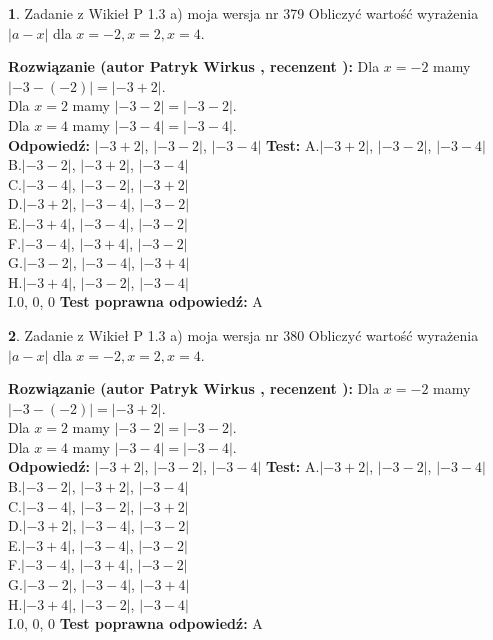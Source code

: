 \documentclass[12pt, a4paper]{article}
\theoremstyle{definition} %
\newtheorem{zad}{}
\newcommand{\zadStart}[1]{\begin{zad}#1\newline}
\newcommand{\zadStop}{\end{zad}}
\newcommand{\rozwStart}[2]{\noindent \textbf{Rozwiązanie (autor #1 , recenzent #2): }\newline}
\newcommand{\rozwStop}{\newline}
\newcommand{\odpStart}{\noindent \textbf{Odpowiedź:}\newline}
\newcommand{\odpStop}{\newline}
\newcommand{\testStart}{\noindent \textbf{Test:}\newline}
\newcommand{\testStop}{\newline}
\newcommand{\kluczStart}{\noindent \textbf{Test poprawna odpowiedź:}\newline}
\newcommand{\kluczStop}{\newline}
\begin{document}
\zadStart{Zadanie z Wikieł P 1.3 a) moja wersja nr 379}
Obliczyć wartość wyrażenia $|a - x|$ dla $x=-2,x=2,x=4$.
\zadStop
\rozwStart{Patryk Wirkus}{}
Dla $x = -2$ mamy $|-3 - (-2)| = |-3 + 2|$.\\
Dla $x = 2$ mamy $|-3 - 2| = |-3 - 2|$.\\
Dla $x = 4$ mamy $|-3 - 4| = |-3 - 4|$.\\
\rozwStop
\odpStart
$|-3 + 2|$, $|-3 - 2|$, $|-3 - 4|$
\odpStop
\testStart
A.$|-3 + 2|$, $|-3 - 2|$, $|-3 - 4|$\\
B.$|-3 - 2|$, $|-3 + 2|$, $|-3 - 4|$\\
C.$|-3 - 4|$, $|-3 - 2|$, $|-3 + 2|$\\
D.$|-3 + 2|$, $|-3 - 4|$, $|-3 - 2|$\\
E.$|-3 + 4|$, $|-3 - 4|$, $|-3 - 2|$\\
F.$|-3 - 4|$, $|-3 + 4|$, $|-3 - 2|$\\
G.$|-3 - 2|$, $|-3 - 4|$, $|-3 + 4|$\\
H.$|-3 + 4|$, $|-3 - 2|$, $|-3 - 4|$\\
I.$0$, $0$, $0$
\testStop
\kluczStart
A
\kluczStop



\zadStart{Zadanie z Wikieł P 1.3 a) moja wersja nr 380}
Obliczyć wartość wyrażenia $|a - x|$ dla $x=-2,x=2,x=4$.
\zadStop
\rozwStart{Patryk Wirkus}{}
Dla $x = -2$ mamy $|-3 - (-2)| = |-3 + 2|$.\\
Dla $x = 2$ mamy $|-3 - 2| = |-3 - 2|$.\\
Dla $x = 4$ mamy $|-3 - 4| = |-3 - 4|$.\\
\rozwStop
\odpStart
$|-3 + 2|$, $|-3 - 2|$, $|-3 - 4|$
\odpStop
\testStart
A.$|-3 + 2|$, $|-3 - 2|$, $|-3 - 4|$\\
B.$|-3 - 2|$, $|-3 + 2|$, $|-3 - 4|$\\
C.$|-3 - 4|$, $|-3 - 2|$, $|-3 + 2|$\\
D.$|-3 + 2|$, $|-3 - 4|$, $|-3 - 2|$\\
E.$|-3 + 4|$, $|-3 - 4|$, $|-3 - 2|$\\
F.$|-3 - 4|$, $|-3 + 4|$, $|-3 - 2|$\\
G.$|-3 - 2|$, $|-3 - 4|$, $|-3 + 4|$\\
H.$|-3 + 4|$, $|-3 - 2|$, $|-3 - 4|$\\
I.$0$, $0$, $0$
\testStop
\kluczStart
A
\kluczStop
\end{document}
